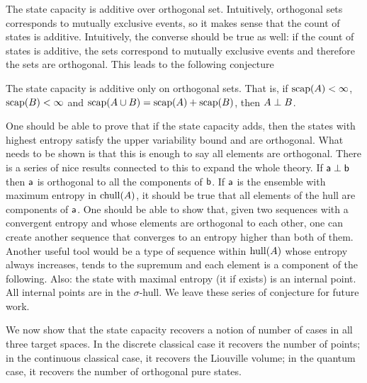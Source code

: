 The state capacity is additive over orthogonal set. Intuitively, orthogonal sets corresponds to mutually exclusive events, so it makes sense that the count of states is additive. Intuitively, the converse should be true as well: if the count of states is additive, the sets correspond to mutually exclusive events and therefore the sets are orthogonal. This leads to the following conjecture

\begin{conj}
	The state capacity is additive only on orthogonal sets. That is, if $\capacity(A)<\infty$, $\capacity(B)<\infty$ and $\capacity(A \cup B) = \capacity(A) +\capacity(B)$, then $A \ortho B$.
\end{conj}

One should be able to prove that if the state capacity adds, then the states with highest entropy satisfy the upper variability bound and are orthogonal. What needs to be shown is that this is enough to say all elements are orthogonal. There is a series of nice results connected to this to expand the whole theory. If $\ens[a] \ortho \ens[b]$ then $\ens[a]$ is orthogonal to all the components of $\ens[b]$. If $\ens[a]$ is the ensemble with maximum entropy in $\chull(A)$, it should be true that all elements of the hull are components of $\ens[a]$. One should be able to show that, given two sequences with a convergent entropy and whose elements are orthogonal to each other, one can create another sequence that converges to an entropy higher than both of them. Another useful tool would be a type of sequence within $\hull(A)$ whose entropy always increases, tends to the supremum and each element is a component of the following. Also: the state with maximal entropy (it if exists) is an internal point. All internal points are in the $\sigma$-hull. We leave these series of conjecture for future work.

We now show that the state capacity recovers a notion of number of cases in all three target spaces. In the discrete classical case it recovers the number of points; in the continuous classical case, it recovers the Liouville volume; in the quantum case, it recovers the number of orthogonal pure states.

